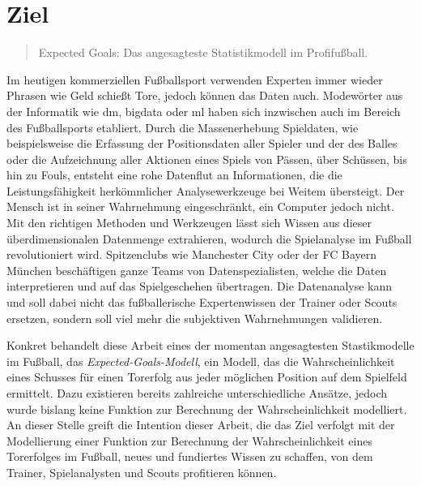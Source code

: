 \section{Ziel}

\begin{quote} 
\glqq Expected Goals: Das angesagteste Statistikmodell im Profifußball.\grqq{}
\end{quote}

Im heutigen kommerziellen Fußballsport verwenden Experten immer wieder Phrasen wie \glqq Geld schießt Tore\grqq, jedoch können das Daten auch. Modewörter aus der Informatik wie \gls{dm}, \gls{bigdata} oder \gls{ml} haben sich inzwischen auch im Bereich des Fußballsports etabliert. Durch die Massenerhebung Spieldaten, wie beispielsweise die Erfassung der Positionsdaten aller Spieler und der des Balles oder die Aufzeichnung aller Aktionen eines Spiels von Pässen, über Schüssen, bis hin zu Fouls, entsteht eine rohe Datenflut an Informationen, die die Leistungsfähigkeit herkömmlicher Analysewerkzeuge bei Weitem übersteigt. Der Mensch ist in seiner Wahrnehmung eingeschränkt, ein Computer jedoch nicht. Mit den richtigen Methoden und Werkzeugen lässt sich Wissen aus dieser überdimensionalen Datenmenge extrahieren, wodurch die Spielanalyse im Fußball revolutioniert wird. Spitzenclubs wie Manchester City oder der FC Bayern München beschäftigen ganze Teams von Datenspezialisten, welche die Daten interpretieren und auf das Spielgeschehen übertragen. Die Datenanalyse kann und soll dabei nicht das fußballerische Expertenwissen der Trainer oder Scouts ersetzen, sondern soll viel mehr die subjektiven Wahrnehmungen validieren. 

Konkret behandelt diese Arbeit eines der momentan angesagtesten Stastikmodelle im Fußball, das \textit{Expected-Goals-Modell}, ein Modell, das die Wahrscheinlichkeit eines Schusses für einen Torerfolg aus jeder möglichen Position auf dem Spielfeld ermittelt. Dazu existieren bereits zahlreiche unterschiedliche Ansätze, jedoch wurde bislang keine Funktion zur Berechnung der Wahrscheinlichkeit modelliert. An dieser Stelle greift die Intention dieser Arbeit, die das Ziel verfolgt mit der Modellierung einer Funktion zur Berechnung der Wahrscheinlichkeit eines Torerfolges im Fußball, neues und fundiertes Wissen zu schaffen, von dem Trainer, Spielanalysten und Scouts profitieren können. 
	